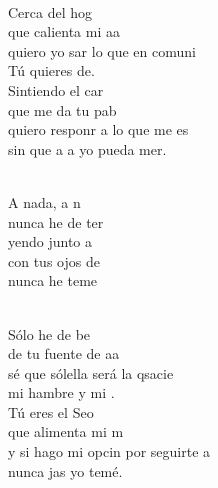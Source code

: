 \begin{cancion}%
	       \chord{(}{**)}{    }\\
	Cerca del hog  \\
	que calienta mi aa \\
	quiero yo sar lo que en comuni\\
	Tú quieres de.\\
\jump
	Sintiendo el car \\
	que me da tu pab \\
	quiero responr a lo que me es\\
	sin que a a yo pueda mer.\\\jump\\
	\begin{chorus}%
	A nada, a n  \\
	nunca he de ter\\
	yendo junto a \\
	con tus ojos de \\
	nunca he  teme\\
	\end{chorus}%
	\jump\\
	Sólo he de be \\
	de tu fuente de aa \\
	sé que sólella será la qsacie\\
	mi hambre y mi .\\
\jump
	Tú eres el Seo \\
	que alimenta mi m \\
	y si hago mi opcin por seguirte a\\
	nunca jas yo temé.\\\jump\\

\end{cancion}
